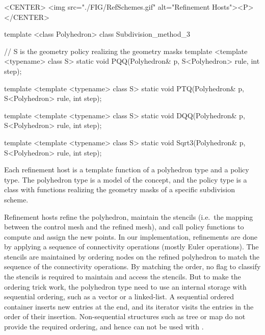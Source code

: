 \begin{ccHtmlOnly}
  <CENTER>
     <img src="./FIG/RefSchemes.gif" alt="Refinement Hosts"><P>
  </CENTER>
\end{ccHtmlOnly}


\begin{ccExampleCode}
template <class Polyhedron>
class Subdivision_method_3 {
  // S is the geometry policy realizing the geometry masks
  template <template <typename> class S>
  static void PQQ(Polyhedron& p, S<Polyhedron> rule, int step);

  template <template <typename> class S>
  static void PTQ(Polyhedron& p, S<Polyhedron> rule, int step);

  template <template <typename> class S>
  static void DQQ(Polyhedron& p, S<Polyhedron> rule, int step);

  template <template <typename> class S>
  static void Sqrt3(Polyhedron& p, S<Polyhedron> rule, int step);
}
\end{ccExampleCode}


Each refinement host is a template function of
a polyhedron type and a policy type. The polyhedron type is
a model of the  concept, and the
policy type is a class with functions realizing the 
geometry masks of a specific subdivision scheme.

Refinement hosts refine the polyhedron, maintain the stencils 
(i.e.~the mapping between the control mesh and the refined mesh), 
and call policy functions to compute and assign the new points. 
In our implementation, refinements are done by applying a 
sequence of connectivity operations (mostly Euler operations).
The stencils are maintained by ordering nodes on the refined 
polyhedron to match the sequence of the connectivity operations. 
By matching the order, no flag to classify the stencils 
is required to maintain and access the stencils.
But to make the ordering trick work, the polyhedron type need 
to use an internal storage with sequential ordering, such as
a vector or a linked-list. A sequential ordered container inserts
new entries at the end, and its iterator visits the entries in the 
order of their insertion. Non-sequential structures such as 
tree or map do not provide the required ordering, and hence
can not be used with .
 
